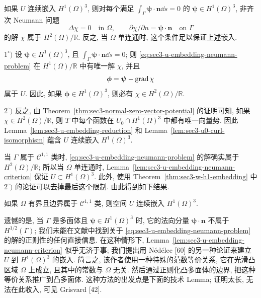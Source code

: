 \setcounter{statement}{6}
\begin{Lemma}\label{lem:sec3-u-embedding-neumann-criterion}
如果 $U$ 连续嵌入 $H^1(\Omega)^3$, 则对每个满足
$\int_\Gamma\boldsymbol\psi\cdot\mathbf n\dd s=0$ 的
$\boldsymbol\psi\in H^1(\Omega)^3$, 非齐次 Neumann 问题
\begin{equation}\label{eq:sec3-u-embedding-neumann-problem}
\Delta\chi=0\quad\text{in }\Omega,
\qquad
\partial\chi/\partial n=\boldsymbol\psi\cdot\mathbf n
\quad\text{on }\Gamma
\end{equation}
的解 $\chi$ 属于 $H^2(\Omega)/\mathbb R$. 反之, 当 $\Omega$ 单连通时,
这个条件足以保证上述嵌入.
\end{Lemma}
\begin{Proof}
$1^\circ)$ 设 $\boldsymbol\psi\in H^1(\Omega)^3$, 且
$\int_\Gamma\boldsymbol\psi\cdot\mathbf n\dd s=0$; 则
\eqref{eq:sec3-u-embedding-neumann-problem} 在 $H^1(\Omega)/\mathbb R$
中有唯一解 $\chi$, 并且
\[
\boldsymbol\phi=\boldsymbol\psi-\operatorname{grad}\chi
\]
属于 $U$. 因此, 如果 $\boldsymbol\phi\in H^1(\Omega)^3$, 则必有
$\chi\in H^2(\Omega)/\mathbb R$.

$2^\circ)$ 反之, 由 Theorem~\ref{thm:sec3-normal-zero-vector-potential} 的证明可知,
如果 $\chi\in H^2(\Omega)/\mathbb R$, 则 $T$ 中每个函数在
$U_0\cap H^1(\Omega)^3$ 中都有唯一向量势. 因此 Lemma~\ref{lem:sec3-u-embedding-reduction}
和 Lemma~\ref{lem:sec3-u0-curl-isomorphism} 蕴含 $U$ 连续嵌入 $H^1(\Omega)^3$.
\end{Proof}

当 $\Gamma$ 属于 $\mathcal C^{1,1}$ 类时,
\eqref{eq:sec3-u-embedding-neumann-problem} 的解确实属于 $H^2(\Omega)/\mathbb R$;
所以当 $\Omega$ 单连通时, Lemma~\ref{lem:sec3-u-embedding-neumann-criterion}
保证 $U\subset H^1(\Omega)^3$. 此外, 使用
Theorem~\ref{thm:sec3-w-h1-embedding} 中 $2^\circ)$ 的论证可以去掉最后这个限制.
由此得到如下结果.

\setcounter{statement}{7}
\begin{Theorem}\label{thm:sec3-u-h1-smooth-boundary}
如果 $\Omega$ 有界且边界属于 $\mathcal C^{1,1}$ 类, 则空间 $U$ 连续嵌入
$H^1(\Omega)^3$.
\end{Theorem}

遗憾的是, 当 $\Gamma$ 是多面体且
$\boldsymbol\psi\in H^1(\Omega)^3$ 时, 它的法向分量
$\boldsymbol\psi\cdot\mathbf n$ 不属于 $H^{1/2}(\Gamma)$; 我们未能在文献中找到关于
\eqref{eq:sec3-u-embedding-neumann-problem} 的解的正则性的任何直接信息.
在这种情形下, Lemma~\ref{lem:sec3-u-embedding-neumann-criterion} 似乎无济于事;
我们提出用 Nédélec [60] 的另一种论证来建立 $U$ 到 $H^1(\Omega)^3$ 的嵌入.
简言之, 该作者使用一种特殊的范数等价关系, 它在光滑凸区域 $\Omega$ 上成立,
且其中的常数与 $\Omega$ 无关. 然后通过正则化凸多面体的边界, 把这种等价关系推广到凸多面体.
这种方法的出发点是下面的技术 Lemma; 证明太长, 无法在此收入, 可见 Grisvard [42].

